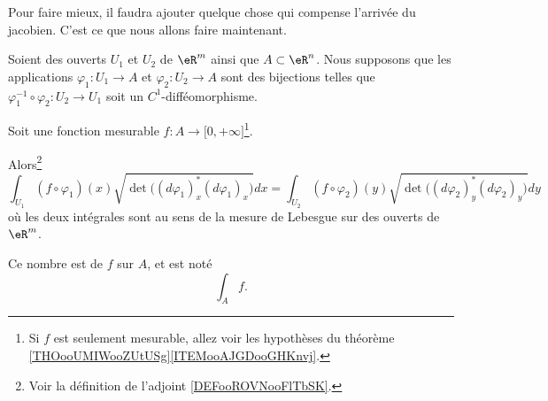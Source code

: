 Pour faire mieux, il faudra ajouter quelque chose qui compense l'arrivée du jacobien. C'est ce que nous allons faire maintenant.

\begin{propositionDef}     \label{PROPooOAHWooAfxvyv}
    Soient des ouverts \( U_1\) et \( U_2\) de \( \eR^m\) ainsi que \( A\subset \eR^n\). Nous supposons que les applications \( \varphi_1\colon U_1\to A\) et \( \varphi_2\colon U_2\to A\) sont des bijections telles que \( \varphi_1^{-1}\circ \varphi_2\colon U_2\to U_1\) soit un \( C^1\)-difféomorphisme. 
        
    Soit une fonction mesurable \( f\colon A\to \mathopen[ 0 , +\infty \mathclose]\)\footnote{Si \( f\) est seulement mesurable, allez voir les hypothèses du théorème \ref{THOooUMIWooZUtUSg}\ref{ITEMooAJGDooGHKnvj}.}.

    Alors\footnote{Voir la définition de l'adjoint \ref{DEFooROVNooFlTbSK}.}
    \begin{equation}
        \int_{U_1}(f\circ \varphi_1)(x)\sqrt{ \det\big( (d\varphi_1)_x^*(d\varphi_1)_x \big) }dx=
        \int_{U_2}(f\circ \varphi_2)(y)\sqrt{ \det\big( (d\varphi_2)_y^*(d\varphi_2)_y \big) }dy
    \end{equation}
    où les deux intégrales sont au sens de la mesure de Lebesgue sur des ouverts de \( \eR^m\).

    Ce nombre est  de \( f\) sur \( A\), et est noté
    \begin{equation}
        \int_Af.
    \end{equation}
\end{propositionDef}

